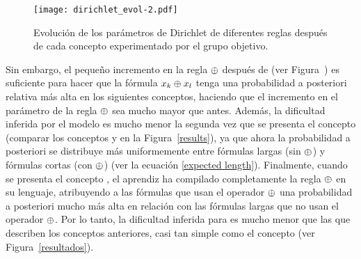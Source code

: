\begin{figure}
        \centering
        \texttt{[image: dirichlet\_evol-2.pdf]}
        \caption{
        Evolución de los parámetros de Dirichlet de diferentes reglas después de cada concepto experimentado por el grupo objetivo.
        }
       \label{evol}
\end{figure}


Sin embargo, el pequeño incremento en la regla $ \oplus $ después de \targetb (ver Figura~) es suficiente para hacer que la fórmula $x_ {k} \oplus x_{l} $ tenga una probabilidad a posteriori relativa más alta en los siguientes conceptos, haciendo que el incremento en el parámetro de la regla $ \oplus $ sea mucho mayor que antes. Además, la dificultad inferida por el modelo es mucho menor la segunda vez que se presenta el concepto (comparar los conceptos \targetd y \targetb en la Figura~\ref{results}), ya que ahora la probabilidad a posteriori se distribuye más uniformemente entre fórmulas largas (sin $ \oplus $) y fórmulas cortas (con $ \oplus $) (ver la ecuación \eqref{expected length}). Finalmente, cuando se presenta el concepto \testa, el aprendiz ha compilado completamente la regla $ \oplus $ en su lenguaje, atribuyendo a las fórmulas que usan el operador $ \oplus $ una probabilidad a posteriori mucho más alta en relación con las fórmulas largas que no usan el operador $ \oplus $. Por lo tanto, la dificultad inferida para \testa es mucho menor que las que describen los conceptos anteriores, casi tan simple como el concepto \targeta (ver Figura~\ref{resultados}).

